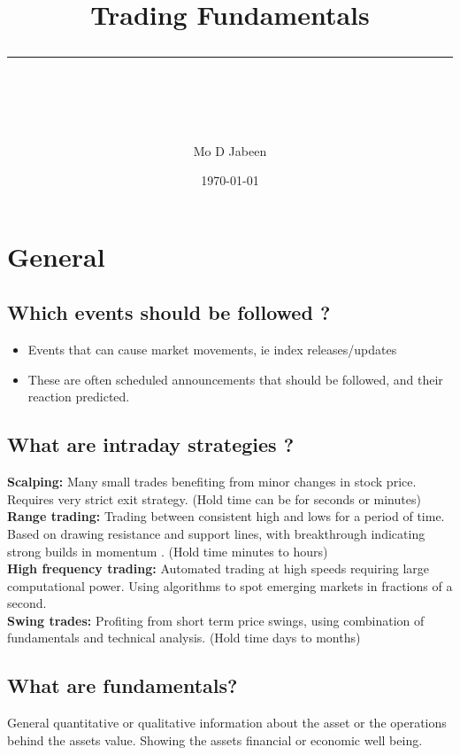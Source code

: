 \documentclass[11pt]{scrartcl} %
\title{	
	\normalfont\normalsize
	\vspace{20pt} %
	{\huge Trading Fundamentals}\\ %
	\vspace{12pt} %
	\rule{\linewidth}{2pt}\\ %
}
\author{\small Mo D Jabeen} %
\date{\normalsize\today} %
\begin{document}
\maketitle %

\section{General}

\subsection{Which events should be followed ?}

\begin{itemize}
	\item Events that can cause market movements, ie index releases/updates
	\item These are often scheduled announcements that should be followed, and their
	reaction predicted.
\end{itemize}

\subsection{What are intraday strategies ?}

\textbf{Scalping:} Many small trades benefiting from minor changes in stock price. Requires
very strict exit strategy. (Hold time can be for seconds or minutes) \\
\textbf{Range trading:} Trading between consistent high and lows for a period of time. Based on
drawing resistance and support lines, with breakthrough indicating strong builds in momentum
. (Hold time minutes to hours)\\
\textbf{High frequency trading:} Automated trading at high speeds requiring large computational power.
Using algorithms to spot emerging markets in fractions of a second.\\
\textbf{Swing trades:} Profiting from short term price swings, using combination of fundamentals and
technical analysis. (Hold time days to months)

\subsection{What are fundamentals?}

General quantitative or qualitative information about the asset or the operations behind the assets
value. Showing the assets financial or economic well being.
\end{document}
